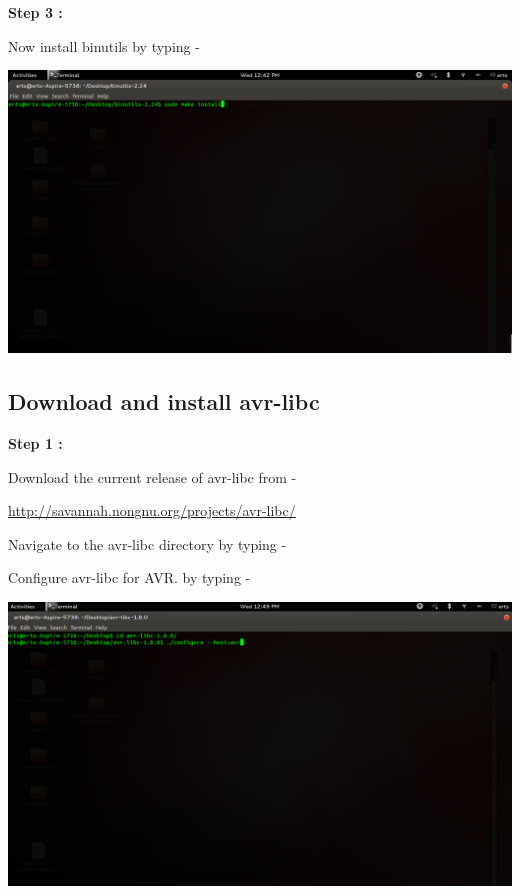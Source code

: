 \begin{flushleft}
\medskip

\textbf{Step 3 :}
 
Now install binutils by typing - 

\medskip


\medskip

\includegraphics[scale=0.3]{f8}

\medskip

\subsection{Download and install avr-libc}

\textbf{Step 1 : }

\medskip

Download the current release of avr-libc from -

\url{http://savannah.nongnu.org/projects/avr-libc/}

\medskip

Navigate to the avr-libc directory by typing - 

\medskip


\medskip

Configure avr-libc for AVR. by typing - 
\medskip


\medskip

\includegraphics[scale=0.3]{f12}


\end{flushleft}

